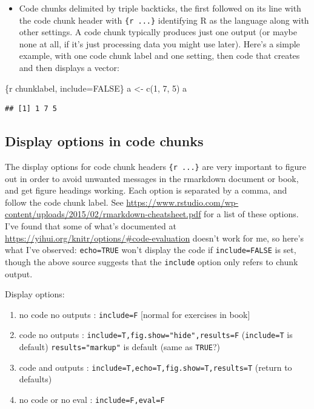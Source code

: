 \documentclass[
]{book}
\newenvironment{Shaded}{\begin{snugshade}}{\end{snugshade}}
\newcommand{\NormalTok}[1]{#1}
\providecommand{\tightlist}{%
  \setlength{\itemsep}{0pt}\setlength{\parskip}{0pt}}
\begin{document}
\begin{itemize}
\tightlist
\item
  Code chunks delimited by triple backticks, the first followed on its line with the code chunk header with \texttt{\{r\ ...\}} identifying R as the language along with other settings. A code chunk typically produces just one output (or maybe none at all, if it's just processing data you might use later). Here's a simple example, with one code chunk label and one setting, then code that creates and then displays a vector:
\end{itemize}

\begin{Shaded}
\begin{Highlighting}[]
\NormalTok{\textasciigrave{}\textasciigrave{}\textasciigrave{}\{r chunklabel, include=FALSE\}}
\NormalTok{a \textless{}{-} c(1, 7, 5)}
\NormalTok{a}
\NormalTok{\textasciigrave{}\textasciigrave{}\textasciigrave{}}
\end{Highlighting}
\end{Shaded}

\begin{verbatim}
## [1] 1 7 5
\end{verbatim}

\hypertarget{display-options-in-code-chunks}{%
\subsection{Display options in code chunks}\label{display-options-in-code-chunks}}

The display options for code chunk headers \texttt{\{r\ ...\}} are very important to figure out in order to avoid unwanted messages in the rmarkdown document or book, and get figure headings working. Each option is separated by a comma, and follow the code chunk label. See \url{https://www.rstudio.com/wp-content/uploads/2015/02/rmarkdown-cheatsheet.pdf} for a list of these options. I've found that some of what's documented at \url{https://yihui.org/knitr/options/\#code-evaluation} doesn't work for me, so here's what I've observed: \texttt{echo=TRUE} won't display the code if \texttt{include=FALSE} is set, though the above source suggests that the \texttt{include} option only refers to chunk output.

Display options:

\begin{enumerate}
\def\labelenumi{\arabic{enumi}.}
\tightlist
\item
  no code no outputs : \texttt{include=F} {[}normal for exercises in book{]}
\item
  code no outputs : \texttt{include=T,fig.show="hide",results=F} (\texttt{include=T} is default) \texttt{results="markup"} is default (same as \texttt{TRUE}?)
\item
  code and outputs : \texttt{include=T,echo=T,fig.show=T,results=T} (return to defaults)
\item
  no code or no eval : \texttt{include=F,eval=F}
\end{enumerate}
\end{document}

